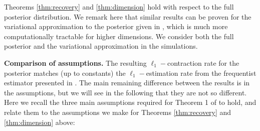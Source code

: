\documentclass[11pt]{article}
\newcommand{\subparspacenonewline}{\vspace{3mm}}
\begin{document}
\begin{remark}\label{rem:var_approx}
	Theorems \ref{thm:recovery} and \ref{thm:dimension} hold with respect to the full posterior distribution. We remark here that similar results can be proven for the variational approximation to the posterior given in \cite{Ray_Szabo_2020}, which is much more computationally tractable for higher dimensions. We consider both the full posterior and the variational approximation in the simulations.
\end{remark}
\subparspacenonewline
 {\bf Comparison of assumptions.}
The resulting $\ell_1-$contraction rate for the posterior matches (up to constants) the $\ell_1-$estimation rate from the frequentist estimator presented in \cite{CBM2020}. The main remaining difference between the results is in the assumptions, but we will see in the following that they are not so different. 
 Here we recall the three main assumptions required for Theorem 1 of \cite{CBM2020} to hold, and relate them to the assumptions we make for Theorems \ref{thm:recovery} and \ref{thm:dimension} above:
\end{document}
